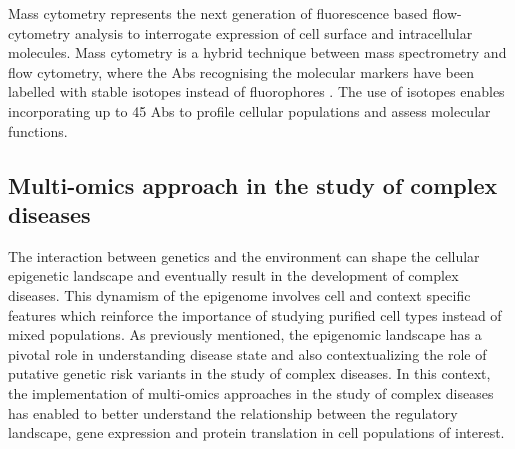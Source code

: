 Mass cytometry represents the next generation of fluorescence based flow-cytometry analysis to interrogate expression of cell surface and intracellular molecules. Mass cytometry is a hybrid technique between mass spectrometry and flow cytometry, where the Abs recognising the molecular markers have been labelled with stable isotopes instead of fluorophores \parencite{Bandura2009}. The use of isotopes enables incorporating up to 45 Abs to profile cellular populations and assess molecular functions. 



\subsection{Multi-omics approach in the study of complex diseases}

The interaction between genetics and the environment can shape the cellular epigenetic landscape and eventually result in the development of complex diseases. This dynamism of the epigenome involves cell and context specific features which reinforce the importance of studying purified cell types instead of mixed populations. As previously mentioned, the epigenomic landscape has a pivotal role in understanding disease state and also contextualizing the role of putative genetic risk variants in the study of complex diseases. In this context, the implementation of multi-omics approaches in the study of complex diseases has enabled to better understand the relationship between the regulatory landscape, gene expression and protein translation in cell populations of interest. 

